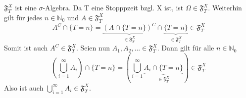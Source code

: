 $\mathfrak{F}_{T}^{X}$ ist eine $\sigma$-Algebra. Da T eine Stopppzeit bzgl. X ist, ist $\Omega \in \mathfrak{F}_{T}^{X}$. Weiterhin gilt für jedes $n \in \mathbb{N}_{0}$ und $A \in \mathfrak{F}_{T}^{X}$
\begin{equation*}
A^{C} \cap \lbrace T = n \rbrace = \underbrace{(A \cap \lbrace T = n \rbrace)^{C}}_{ \in \mathfrak{F}_{T}^{X}} \cap \underbrace{\lbrace T = n \rbrace}_{ \in \mathfrak{F}_{T}^{X}} \in \mathfrak{F}_{T}^{X}
\end{equation*}
Somit ist auch $A^{C} \in \mathfrak{F}_{T}^{X}$. Seien nun $A_{1},A_{2},... \in \mathfrak{F}_{T}^{X}$. Dann gilt für alle $n \in \mathbb{N}_{0}$
\begin{equation*}
(\bigcup_{i=1}^{\infty} A_{i}) \cap \lbrace T = n \rbrace = (\bigcup_{i=1}^{\infty} \underbrace { A_{i} \cap \lbrace T = n \rbrace}_{ \in \mathfrak{F}_{T}^{X}}) \in \mathfrak{F}_{T}^{X}
\end{equation*}
Also ist auch $\bigcup_{i=1}^{\infty} A_{i} \in \mathfrak{F}_{T}^{X}$.